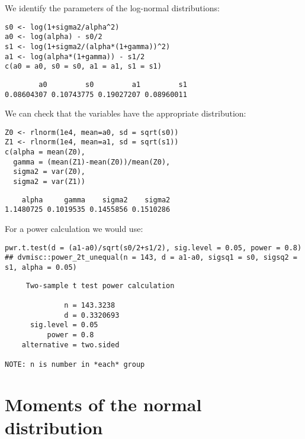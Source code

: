 \documentclass[12pt]{article}
\begin{document}
We identify the parameters of the log-normal distributions:
\lstset{language=r,label= ,caption= ,captionpos=b,numbers=none}
\begin{lstlisting}
s0 <- log(1+sigma2/alpha^2)
a0 <- log(alpha) - s0/2 
s1 <- log(1+sigma2/(alpha*(1+gamma))^2)
a1 <- log(alpha*(1+gamma)) - s1/2 
c(a0 = a0, s0 = s0, a1 = a1, s1 = s1)
\end{lstlisting}

\begin{verbatim}
        a0         s0         a1         s1 
0.08604307 0.10743775 0.19027207 0.08960011
\end{verbatim}

We can check that the variables have the appropriate distribution:
\lstset{language=r,label= ,caption= ,captionpos=b,numbers=none}
\begin{lstlisting}
Z0 <- rlnorm(1e4, mean=a0, sd = sqrt(s0))
Z1 <- rlnorm(1e4, mean=a1, sd = sqrt(s1))
c(alpha = mean(Z0), 
  gamma = (mean(Z1)-mean(Z0))/mean(Z0), 
  sigma2 = var(Z0), 
  sigma2 = var(Z1))
\end{lstlisting}

\begin{verbatim}
    alpha     gamma    sigma2    sigma2 
1.1480725 0.1019535 0.1455856 0.1510286
\end{verbatim}

For a power calculation we would use:
\lstset{language=r,label= ,caption= ,captionpos=b,numbers=none}
\begin{lstlisting}
pwr.t.test(d = (a1-a0)/sqrt(s0/2+s1/2), sig.level = 0.05, power = 0.8)
## dvmisc::power_2t_unequal(n = 143, d = a1-a0, sigsq1 = s0, sigsq2 = s1, alpha = 0.05)
\end{lstlisting}

\begin{verbatim}
     Two-sample t test power calculation 

              n = 143.3238
              d = 0.3320693
      sig.level = 0.05
          power = 0.8
    alternative = two.sided

NOTE: n is number in *each* group
\end{verbatim}

\clearpage

\section{Moments of the normal distribution}
\label{sec:orgd606dd8}
\end{document}
